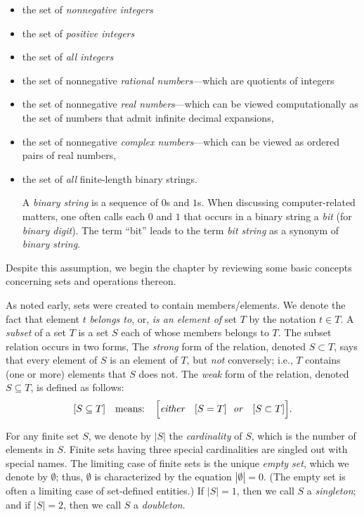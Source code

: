 \begin{itemize}
\item
the set of {\em nonnegative integers}
\item
the set of {\em positive integers}
\item
the set of {\em all integers}
\item
the set of nonnegative {\em rational numbers}---which are quotients of
integers
\item
the set of nonnegative {\em real numbers}---which can be viewed
computationally as the set of numbers that admit infinite decimal
expansions,
\item
the set of nonnegative {\em complex numbers}---which can be viewed as
ordered pairs of real numbers,
\item
the set of {\em all} finite-length binary strings.

A {\it binary string} is a sequence of $0$s and
$1$s.  When discussing computer-related matters, one often calls each
$0$ and $1$ that occurs in a binary string a {\it bit} (for {\it binary digit}).  The term ``bit'' leads to
the term {\it bit string} as a synonym of {\it binary string}.
\end{itemize}
Despite this assumption, we begin the chapter by reviewing some basic
concepts concerning sets and operations thereon.

As noted early, sets were created to contain members/elements.  We
denote the fact that element $t$ {\it belongs to}, or, {\it is an element of} set $T$ by the
notation $t \in T$.  A {\em
  subset} of a set $T$ is a set $S$ each of whose
members belongs to $T$.  The subset relation occurs in two forms, The
{\em strong} form of the relation, denoted $S \subset
T$, says that every element of $S$
is an element of $T$, but {\em not} conversely; i.e., $T$ contains
(one or more) elements that $S$ does not.  The {\em weak} form of the
relation, denoted $S \subseteq T$,
is defined as follows:
\[
[S \subseteq T] \ \ \mbox{ means: } \ \
\Big[ \mbox{\em either } \ \ [S = T]
\ \ \mbox{\em or } \ \ [S \subset T] \Big].
\]

For any finite set $S$, we denote by $|S|$ the {\em
  cardinality} of $S$, which is the number of
elements in $S$.  Finite sets having three special cardinalities are
singled out with special names.  The limiting case of finite sets is
the unique {\em empty set}, which we denote by $\emptyset$; thus,
$\emptyset$ is characterized by the equation $|\emptyset| = 0$.  (The
empty set is often a limiting case of set-defined entities.)  If $|S|
= 1$, then we call $S$ a {\em singleton};\index{Set!singleton set} and
if $|S| = 2$, then we call $S$ a {\em doubleton}.\index{Set!doubleton}

